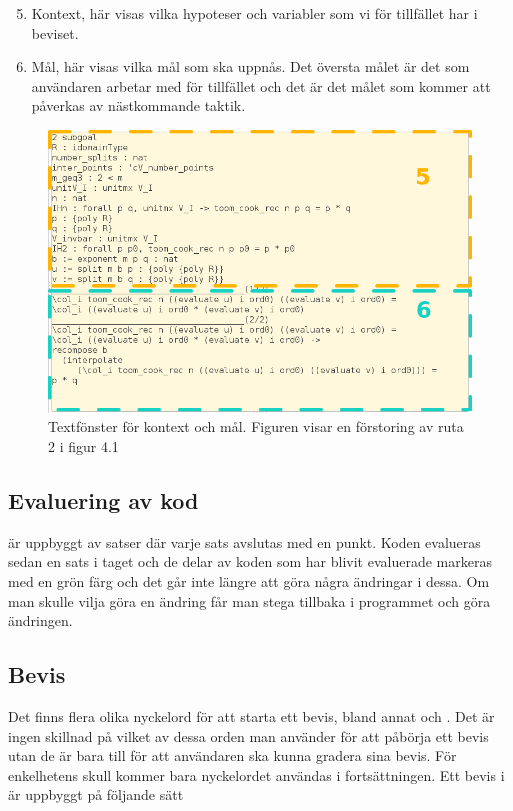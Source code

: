 \begin{enumerate}
  \setcounter{enumi}{4}
\item Kontext, här visas vilka hypoteser och variabler som vi för tillfället
  har i beviset.
\item Mål, här visas vilka mål som ska uppnås. Det översta målet är det som
  användaren arbetar med för tillfället och det är det målet som kommer att
  påverkas av nästkommande taktik.
\end{enumerate}

\begin{figure}[H]
  \centering
  \includegraphics[width=150mm]{images/Kontext}
  \caption[Fönster för kontext och mål]
   {Textfönster för kontext och mål. Figuren visar en förstoring av ruta 2 i
    figur 4.1}
\end{figure}




\subsection{Evaluering av kod}
\coq{} är uppbyggt av satser där varje sats avslutas med en punkt. Koden
evalueras sedan en sats i taget och de delar av koden som har blivit evaluerade
markeras med en grön färg och det går inte längre att göra några ändringar i
dessa. Om man skulle vilja göra en ändring får man stega tillbaka
i programmet och göra ändringen.

\subsection{Bevis}
Det finns flera olika nyckelord för att starta ett bevis, bland annat
 och . Det är ingen skillnad på vilket av dessa orden man
använder för att påbörja ett bevis utan de är bara till för att användaren ska
kunna gradera sina bevis. För enkelhetens skull kommer bara nyckelordet
 användas i fortsättningen. Ett bevis i \coq{} är uppbyggt på följande
sätt

